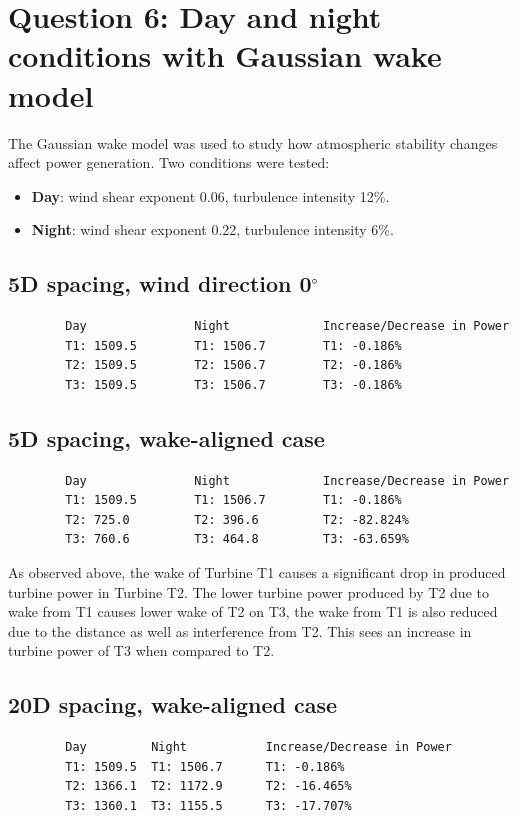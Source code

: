 \documentclass[11pt,a4paper]{article}
\begin{document}
	\section{Question 6: Day and night conditions with Gaussian wake model}
	The Gaussian wake model was used to study how atmospheric stability changes affect power generation. Two conditions were tested:
	\begin{itemize}[leftmargin=1.2em]
		\item \textbf{Day}: wind shear exponent 0.06, turbulence intensity 12\%.
		\item \textbf{Night}: wind shear exponent 0.22, turbulence intensity 6\%.
	\end{itemize}
	
	\subsection{5D spacing, wind direction 0$^\circ$}
	\begin{lstlisting}
		Day               Night             Increase/Decrease in Power
		T1: 1509.5        T1: 1506.7        T1: -0.186%
		T2: 1509.5        T2: 1506.7        T2: -0.186%
		T3: 1509.5        T3: 1506.7        T3: -0.186%
	\end{lstlisting}
	
	\subsection{5D spacing, wake-aligned case}
	\begin{lstlisting}
		Day               Night             Increase/Decrease in Power
		T1: 1509.5        T1: 1506.7        T1: -0.186%
		T2: 725.0         T2: 396.6         T2: -82.824%
		T3: 760.6         T3: 464.8         T3: -63.659%
	\end{lstlisting}
	
	As observed above, the wake of Turbine T1 causes a significant drop in produced turbine power in Turbine T2. The lower turbine power produced by T2 due to wake from T1 causes lower wake of T2 on T3, the wake from T1 is also reduced due to the distance as well as interference from T2. This sees an increase in turbine power of T3 when compared to T2.
	
	\subsection{20D spacing, wake-aligned case}
	\begin{lstlisting}
		Day         Night           Increase/Decrease in Power
		T1: 1509.5  T1: 1506.7      T1: -0.186%
		T2: 1366.1  T2: 1172.9      T2: -16.465%
		T3: 1360.1  T3: 1155.5      T3: -17.707%
	\end{lstlisting}
	
\end{document}
